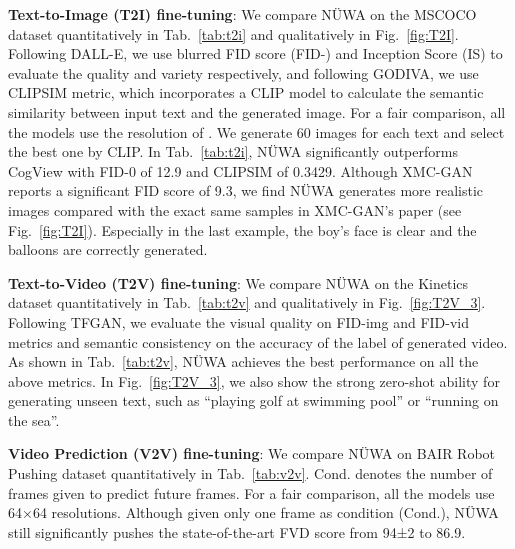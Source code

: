 \documentclass[10pt,twocolumn,letterpaper]{article}
\begin{document}
\textbf{Text-to-Image (T2I) fine-tuning}: We compare NÜWA on the MSCOCO\cite{linMicrosoftCocoCommon2014} dataset quantitatively in Tab.~\ref{tab:t2i} and qualitatively in Fig.~\ref{fig:T2I}. Following DALL-E\cite{rameshZeroShotTexttoImageGeneration2021}, we use  blurred FID score (FID-) and Inception Score (IS)\cite{salimansImprovedTechniquesTraining2016} to evaluate the quality and variety respectively, and following GODIVA\cite{wuGODIVAGeneratingOpenDomaIn2021}, we use CLIPSIM metric, which incorporates a CLIP\cite{radfordLearningTransferableVisual2021} model to calculate the semantic similarity between input text and the generated image. For a fair comparison, all the models use the resolution of . We generate 60 images for each text and select the best one by CLIP\cite{radfordLearningTransferableVisual2021}. In Tab.~\ref{tab:t2i}, NÜWA significantly outperforms CogView\cite{dingCogViewMasteringTexttoImage2021} with FID-0 of 12.9 and CLIPSIM of 0.3429. Although XMC-GAN\cite{zhangCrossmodalContrastiveLearning2021} reports a significant FID score of 9.3, we find NÜWA generates more realistic images compared with the exact same samples in XMC-GAN's paper (see Fig.~\ref{fig:T2I}). Especially in the last example, the boy's face is clear and the balloons are correctly generated. 







\textbf{Text-to-Video (T2V) fine-tuning}: We compare NÜWA on the Kinetics\cite{kayKineticsHumanAction2017} dataset quantitatively in Tab.~\ref{tab:t2v} and qualitatively in Fig.~\ref{fig:T2V_3}. Following TFGAN\cite{balajiConditionalGANDiscriminative2019}, we evaluate the visual quality on FID-img and FID-vid metrics and semantic consistency on the accuracy of the label of generated video. As shown in Tab.~\ref{tab:t2v}, NÜWA achieves the best performance on all the above metrics. In Fig.~\ref{fig:T2V_3}, we also show the strong zero-shot ability for generating unseen text, such as “playing golf at swimming pool” or “running on the sea”.

\textbf{Video Prediction (V2V) fine-tuning}: We compare NÜWA on BAIR Robot Pushing\cite{ebertSelfSupervisedVisualPlanning2017} dataset quantitatively in Tab.~\ref{tab:v2v}. Cond. denotes the number of frames given to predict future frames. For a fair comparison, all the models use 64×64 resolutions. Although given only one frame as condition (Cond.), NÜWA still significantly pushes the state-of-the-art FVD\cite{unterthinerAccurateGenerativeModels2018} score from 94±2 to 86.9.
\end{document}
